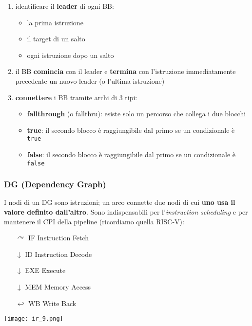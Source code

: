 \begin{enumerate}
  \item identificare il \textbf{leader} di ogni BB:
    \begin{itemize}
      \item la prima istruzione
      \item il target di un salto
      \item ogni istruzione dopo un salto
    \end{itemize}
  \item il BB \textbf{comincia} con il leader e \textbf{termina} con l'istruzione immediatamente precedente un nuovo leader (o l'ultima istruzione)
  \item \textbf{connettere} i BB tramite archi di 3 tipi:
    \begin{itemize}
      \item \textbf{fallthrough} (o fallthru): esiste solo un percorso che collega i due blocchi
      \item \textbf{true}: il secondo blocco \`e raggiungibile dal primo se un condizionale \`e \lstinline|true|
      \item \textbf{false}: il secondo blocco \`e raggiungibile dal primo se un condizionale \`e \lstinline|false|
    \end{itemize}
\end{enumerate}

\subsubsection{DG (Dependency Graph)}

I nodi di un DG sono istruzioni; un arco connette due nodi di cui \textbf{uno usa il valore definito dall'altro}. Sono indispensabili per l'\textit{instruction scheduling} e per mantenere il CPI della pipeline (ricordiamo quella RISC-V):\\

\noindent\begin{minipage}[c]{.6\textwidth}
  \begin{itemize}
    \item[$\curvearrowright$] IF Instruction Fetch
    \item[$\downarrow$] ID Instruction Decode
    \item[$\downarrow$] EXE Execute
    \item[$\downarrow$] MEM Memory Access
    \item[$\hookleftarrow$] WB Write Back
  \end{itemize}
\end{minipage}
\begin{minipage}[c]{.4\textwidth}
  \centering
  \texttt{[image: ir\_9.png]}
\end{minipage}\\

